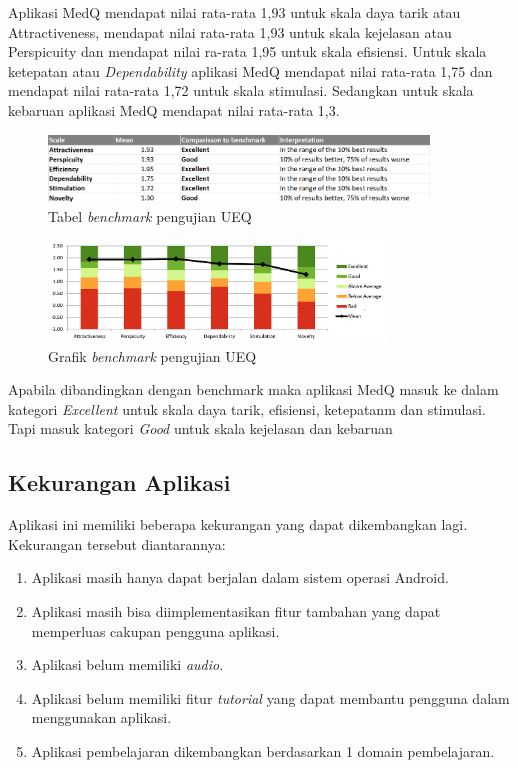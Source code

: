 Aplikasi MedQ mendapat nilai rata-rata 1,93 untuk skala daya tarik atau 
Attractiveness, mendapat nilai rata-rata 1,93 untuk skala kejelasan atau 
Perspicuity dan mendapat nilai ra-rata 1,95 untuk skala efisiensi. Untuk skala 
ketepatan atau \textit{Dependability} aplikasi MedQ mendapat nilai rata-rata 1,75 dan 
mendapat nilai rata-rata 1,72 untuk skala stimulasi. Sedangkan untuk skala 
kebaruan aplikasi MedQ mendapat nilai rata-rata 1,3. 
\begin{figure}[H]
	\centering
	\includegraphics[width=0.9\textwidth]{contents/chapter-4/images/BenchMark.png}
	\caption{Tabel \textit{benchmark} pengujian UEQ}
	\label{Fig : benchmark}
\end{figure}
\begin{figure}[H]
	\centering
	\includegraphics[width=0.8\textwidth]{contents/chapter-4/images/BenchMark-graph.png}
	\caption{Grafik \textit{benchmark} pengujian UEQ}
	\label{Fig : benchmark-graph}
\end{figure}
Apabila dibandingkan dengan benchmark maka aplikasi MedQ masuk ke 
dalam kategori \textit{Excellent} untuk skala daya tarik, efisiensi, ketepatanm dan stimulasi.
Tapi masuk kategori \textit{Good} untuk skala kejelasan dan kebaruan

\newpage
\subsection{Kekurangan Aplikasi}
Aplikasi ini memiliki beberapa kekurangan yang dapat dikembangkan lagi. Kekurangan tersebut diantarannya:
\begin{enumerate}
	\item Aplikasi masih hanya dapat berjalan dalam sistem operasi Android.
	\item Aplikasi masih bisa diimplementasikan fitur tambahan yang dapat memperluas cakupan pengguna aplikasi.
	\item Aplikasi belum memiliki \textit{audio}.
	\item Aplikasi belum memiliki fitur \textit{tutorial} yang dapat membantu pengguna dalam menggunakan aplikasi.
	\item Aplikasi pembelajaran dikembangkan berdasarkan 1 domain pembelajaran.
\end{enumerate}